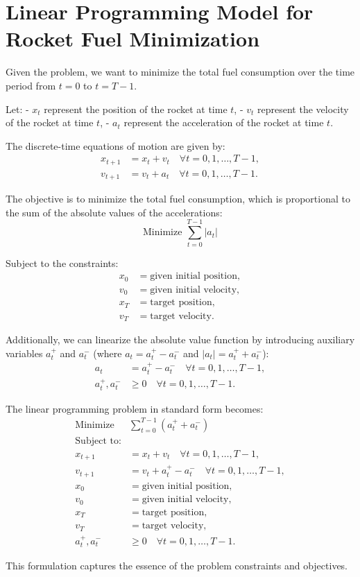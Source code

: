 \documentclass{article}
\begin{document}
\section*{Linear Programming Model for Rocket Fuel Minimization}

Given the problem, we want to minimize the total fuel consumption over the time period from $t = 0$ to $t = T-1$. 

Let:
- $x_t$ represent the position of the rocket at time $t$,
- $v_t$ represent the velocity of the rocket at time $t$,
- $a_t$ represent the acceleration of the rocket at time $t$.

The discrete-time equations of motion are given by:
\begin{align}
    x_{t+1} &= x_t + v_t \quad \forall t = 0, 1, \dots, T-1, \\
    v_{t+1} &= v_t + a_t \quad \forall t = 0, 1, \dots, T-1.
\end{align}

The objective is to minimize the total fuel consumption, which is proportional to the sum of the absolute values of the accelerations:
\[
\text{Minimize } \sum_{t=0}^{T-1} |a_t|
\]

Subject to the constraints:
\begin{align}
    x_0 &= \text{given initial position}, \\
    v_0 &= \text{given initial velocity}, \\
    x_T &= \text{target position}, \\
    v_T &= \text{target velocity}.
\end{align}

Additionally, we can linearize the absolute value function by introducing auxiliary variables $a^+_t$ and $a^-_t$ (where $a_t = a^+_t - a^-_t$ and $|a_t| = a^+_t + a^-_t$):
\begin{align}
    a_t &= a^+_t - a^-_t \quad \forall t = 0, 1, \dots, T-1, \\
    a^+_t, a^-_t &\geq 0 \quad \forall t = 0, 1, \dots, T-1.
\end{align}

The linear programming problem in standard form becomes:
\begin{align}
    \text{Minimize } & \sum_{t=0}^{T-1} (a^+_t + a^-_t) \\
    \text{Subject to:} \\
    x_{t+1} &= x_t + v_t \quad \forall t = 0, 1, \dots, T-1, \\
    v_{t+1} &= v_t + a^+_t - a^-_t \quad \forall t = 0, 1, \dots, T-1, \\
    x_0 &= \text{given initial position}, \\
    v_0 &= \text{given initial velocity}, \\
    x_T &= \text{target position}, \\
    v_T &= \text{target velocity}, \\
    a^+_t, a^-_t &\geq 0 \quad \forall t = 0, 1, \dots, T-1.
\end{align}

This formulation captures the essence of the problem constraints and objectives.
\end{document}
